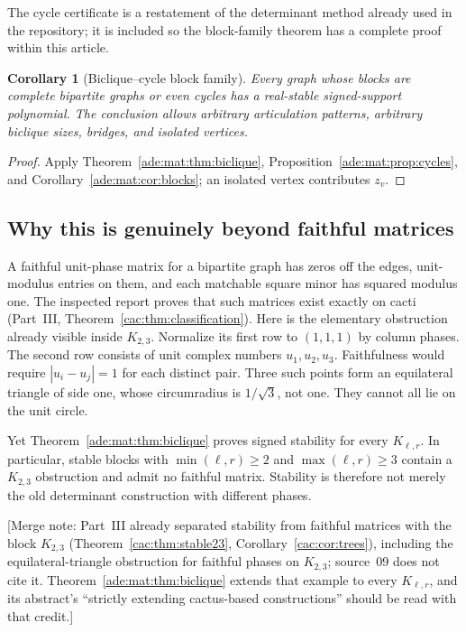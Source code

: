 \documentclass[11pt]{article}
\numberwithin{equation}{section}
\newtheorem{corollary}[theorem]{Corollary}
\theoremstyle{definition}
\begin{document}
The cycle certificate is a restatement of the determinant method already
used in the repository; it is included so the block-family theorem has a
complete proof within this article.

\begin{corollary}[Biclique--cycle block family]\label{ade:mat:cor:block-family}
Every graph whose blocks are complete bipartite graphs or even cycles has
a real-stable signed-support polynomial. The conclusion allows arbitrary
articulation patterns, arbitrary biclique sizes, bridges, and isolated
vertices.
\end{corollary}
\begin{proof}
Apply Theorem~\ref{ade:mat:thm:biclique}, Proposition~\ref{ade:mat:prop:cycles}, and
Corollary~\ref{ade:mat:cor:blocks}; an isolated vertex contributes $z_v$.
\end{proof}

\subsection{Why this is genuinely beyond faithful matrices}
A faithful unit-phase matrix for a bipartite graph has zeros off the edges,
unit-modulus entries on them, and each matchable square minor has squared
modulus one. The inspected report proves that such matrices exist exactly
on cacti (Part~III, Theorem~\ref{cac:thm:classification}). Here is the elementary obstruction already visible
inside $K_{2,3}$. Normalize its first row to $(1,1,1)$ by column phases.
The second row consists of unit complex numbers $u_1,u_2,u_3$. Faithfulness
would require $|u_i-u_j|=1$ for each distinct pair. Three such points form
an equilateral triangle of side one, whose circumradius is $1/\sqrt3$, not
one. They cannot all lie on the unit circle.

Yet Theorem~\ref{ade:mat:thm:biclique} proves signed stability for every
$K_{\ell,r}$. In particular, stable blocks with $\min(\ell,r)\geq2$ and
$\max(\ell,r)\geq3$ contain a $K_{2,3}$ obstruction and admit no faithful
matrix. Stability is therefore not merely the old determinant construction
with different phases.

[Merge note: Part~III already separated stability from faithful
matrices with the block $K_{2,3}$ (Theorem~\ref{cac:thm:stable23},
Corollary~\ref{cac:cor:trees}), including the equilateral-triangle
obstruction for faithful phases on $K_{2,3}$; source~09 does not cite it.
Theorem~\ref{ade:mat:thm:biclique} extends that example to every $K_{\ell,r}$,
and its abstract's ``strictly extending cactus-based constructions'' should
be read with that credit.]
\end{document}
